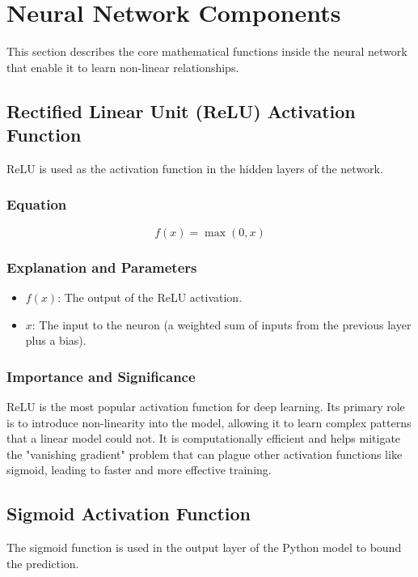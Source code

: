 \documentclass[12pt, a4paper]{article}
\begin{document}
\section{Neural Network Components}
This section describes the core mathematical functions inside the neural network that enable it to learn non-linear relationships.

\subsection{Rectified Linear Unit (ReLU) Activation Function}
ReLU is used as the activation function in the hidden layers of the network.

\subsubsection{Equation}
\begin{equation}
f(x) = \max(0, x)
\end{equation}

\subsubsection{Explanation and Parameters}
\begin{itemize}
    \item \textbf{$f(x)$}: The output of the ReLU activation.
    \item \textbf{$x$}: The input to the neuron (a weighted sum of inputs from the previous layer plus a bias).
\end{itemize}

\subsubsection{Importance and Significance}
ReLU is the most popular activation function for deep learning. Its primary role is to introduce non-linearity into the model, allowing it to learn complex patterns that a linear model could not. It is computationally efficient and helps mitigate the "vanishing gradient" problem that can plague other activation functions like sigmoid, leading to faster and more effective training.

\subsection{Sigmoid Activation Function}
The sigmoid function is used in the output layer of the Python model to bound the prediction.
\end{document}
